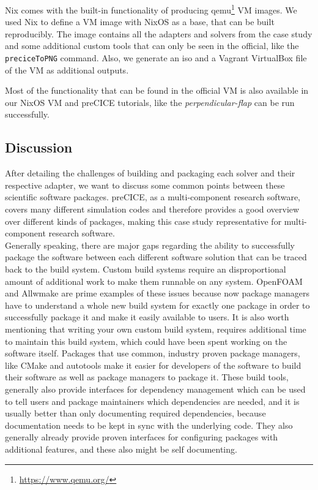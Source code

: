\documentclass{eceasst}
\begin{document}
Nix comes with the built-in functionality of producing qemu\footnote{\url{https://www.qemu.org/}} VM images.
We used Nix to define a VM image with NixOS as a base, that can be built reproducibly.
The image contains all the adapters and solvers from the case study and some additional custom tools that can only be seen in the official, like the \texttt{preciceToPNG} command.
Also, we generate an iso and a Vagrant VirtualBox file of the VM as additional outputs.

Most of the functionality that can be found in the official VM is also available in our NixOS VM and preCICE tutorials, like the \textit{perpendicular-flap} can be run successfully.

\subsection{Discussion}

After detailing the challenges of building and packaging each solver and their respective adapter, we want to discuss some common points between these scientific software packages.
preCICE, as a multi-component research software, covers many different simulation codes and therefore provides a good overview over different kinds of packages, making this case study representative for multi-component research software.\\

Generally speaking, there are major gaps regarding the ability to successfully package the software between each different software solution that can be traced back to the build system.
Custom build systems require an disproportional amount of additional work to make them runnable on any system.
OpenFOAM and Allwmake are prime examples of these issues because now package managers have to understand a whole new build system for exactly one package in order to successfully package it and make it easily available to users.
It is also worth mentioning that writing your own custom build system, requires additional time to maintain this build system, which could have been spent working on the software itself.
Packages that use common, industry proven package managers, like CMake and autotools make it easier for developers of the software to build their software as well as package managers to package it.
These build tools, generally also provide interfaces for dependency management which can be used to tell users and package maintainers which dependencies are needed, and it is usually better than only documenting required dependencies, because documentation needs to be kept in sync with the underlying code.
They also generally already provide proven interfaces for configuring packages with additional features, and these also might be self documenting.
\end{document}
